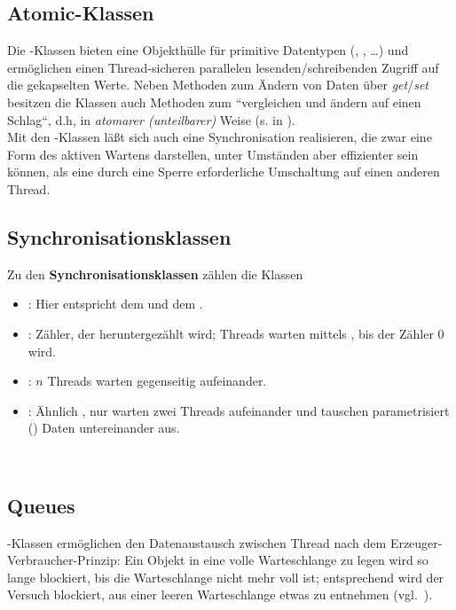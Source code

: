 \subsection*{Atomic-Klassen}
Die -Klassen bieten eine Objekthülle für primitive Datentypen (, , \ldots) und ermöglichen einen Thread-sicheren parallelen lesenden/schreibenden Zugriff auf die gekapselten Werte.
Neben Methoden zum Ändern von Daten über \textit{get}/\textit{set} besitzen die Klassen auch Methoden zum ``vergleichen und ändern auf einen Schlag``, d.h, in \textit{atomarer (unteilbarer)} Weise (s.  in \cite[157]{Oec22}).\\

\noindent
Mit den -Klassen läßt sich auch eine  Synchronisation realisieren, die zwar eine Form des aktiven Wartens darstellen, unter Umständen aber effizienter sein können, als eine durch eine Sperre erforderliche Umschaltung auf einen anderen Thread.\\

\subsection*{Synchronisationsklassen}
Zu den \textbf{Synchronisationsklassen} zählen die Klassen
\begin{itemize}
    \item {}: Hier entspricht  dem  und  dem .
    \item {}: Zähler, der heruntergezählt wird; Threads warten mittels , bis der Zähler $0$ wird.
    \item {}: $n$ Threads warten gegenseitig aufeinander.
    \item {}: Ähnlich , nur warten zwei Threads aufeinander und tauschen parametrisiert () Daten untereinander aus.
\end{itemize}\\

\subsection*{Queues}
-Klassen ermöglichen den  Datenaustausch zwischen Thread nach dem Erzeuger-Verbraucher-Prinzip: Ein Objekt in eine volle Warteschlange zu legen wird so lange blockiert, bis die Warteschlange nicht mehr voll ist; entsprechend wird der Versuch blockiert, aus einer leeren Warteschlange etwas zu entnehmen (vgl.~\cite[164]{Oec22}).

